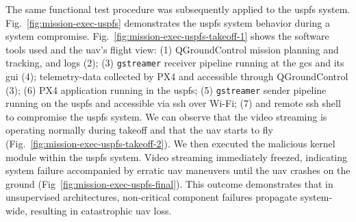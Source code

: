 

The same functional test procedure was subsequently applied to the \gls{uspfs}
system.
Fig.~\ref{fig:mission-exec-uspfs} demonstrates the \gls{uspfs} system behavior
during a system compromise. Fig.~\ref{fig:mission-exec-uspfs-takeoff-1} shows
the software tools used and the \gls{uav}'s flight view: (1) QGroundControl
mission planning and tracking, and logs (2); (3) \lstinline{gstreamer} receiver pipeline
running at the \gls{gcs} and its \gls{gui} (4); telemetry-data collected by PX4
and accessible through QGroundControl (3); (6) PX4 application running in the
\gls{uspfs}; (5) \lstinline{gstreamer} sender pipeline
running on the \gls{uspfs} and accessible via
\gls{ssh} over Wi-Fi; (7) and remote \gls{ssh} shell to compromise the
\gls{uspfs} system. We can observe that the video streaming is operating normally during
takeoff and that the \gls{uav} starts to fly (Fig.~\ref{fig:mission-exec-uspfs-takeoff-2}).
We then executed the malicious kernel module within the \gls{uspfs}
system. Video streaming immediately freezed, indicating system failure
accompanied by erratic \gls{uav} maneuvers until the \gls{uav} crashes on the
ground (Fig~\ref{fig:mission-exec-uspfs-final}).
%
This outcome demonstrates that in unsupervised architectures, non-critical
component failures propagate system-wide, resulting in catastrophic \gls{uav}
loss.

